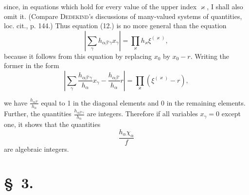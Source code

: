\documentclass[11pt]{article}
\begin{document}
since, in equations which hold for every value of the upper index $\varkappa$, I shall also omit it. (Compare \textsc{Dedekind}'s discussions of many-valued systems of quantities, loc. cit., p. 144.) Thus equation (12.) is no more general than the equation
\begin{equation*}\tag{14.}
\left|\sum_\gamma h_{\alpha\beta'\gamma}x_\gamma\right|=\prod_\varkappa h_\varkappa\xi^{(\varkappa)},
\end{equation*}
because it follows from this equation by replacing $x_0$ by $x_0-r$. Writing the former in the form
\[
\left|\sum_\gamma \frac{h_{\alpha\beta'\gamma}}{h_\alpha}x_\gamma-\frac{h_{\alpha\beta'}}{h_\alpha}r\right|=\prod_\varkappa(\xi^{(\varkappa)}-r),
\]


we have $\frac{h_{\alpha\beta'}}{h_\alpha}$ equal to 1 in the diagonal elements and 0 in the remaining elements. Further, the quantities $\frac{h_{\alpha\beta'\gamma}}{h_\alpha}$ are integers. Therefore if all variables $x_\gamma=0$ except one, it shows that the quantities
\begin{equation*}\tag{15.}
\frac{h_\alpha\chi_\alpha}{f}
\end{equation*}
are algebraic integers.

\section*{\S~3.}
\end{document}
